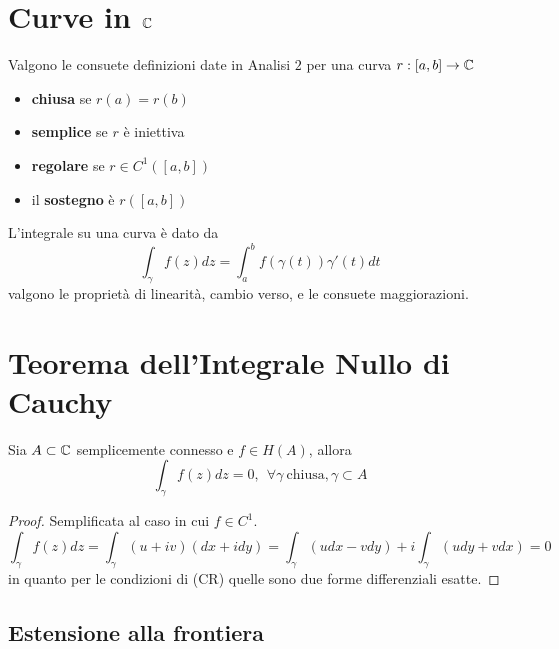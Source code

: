 
\section{Curve in \texorpdfstring{$\mathbb{C}$}{C}}

Valgono le consuete definizioni date in Analisi $2$ per una curva $r: [a, b]\rightarrow \mathbb{C}$
\begin{itemize}
\item \textbf{chiusa} se $r(a) = r(b)$
\item \textbf{semplice} se $r$ è iniettiva
\item \textbf{regolare} se $r\in C^{1}([a, b])$
\item il \textbf{sostegno} è $r([a, b])$
\end{itemize}

L'integrale su una curva è dato da
\begin{equation*}
\int_{\gamma} f(z) dz = \int^{b}_{a} f(\gamma (t)) \gamma'(t) dt
\end{equation*}
valgono le proprietà di linearità, cambio verso, e le consuete maggiorazioni.

\section{Teorema dell'Integrale Nullo di Cauchy}

\begin{thm}
 Sia $A\subset \mathbb{C}$ semplicemente connesso e $f\in H(A)$, allora
\begin{equation*}
\int_{\gamma} f(z) dz = 0, \ \ \forall \gamma \ \text{chiusa}, \gamma \subset A
\end{equation*}
\end{thm}
\begin{proof}
Semplificata al caso in cui $f\in C^{1}$.
\begin{equation*}
\int_{\gamma} f(z) dz = \int_{\gamma}(u + iv)(dx + idy) = \int_{\gamma}(udx - vdy) + i\int_{\gamma}(udy + vdx) = 0
\end{equation*}
in quanto per le condizioni di (CR) quelle sono due forme differenziali esatte.
\end{proof}

\subsection{Estensione alla frontiera}

